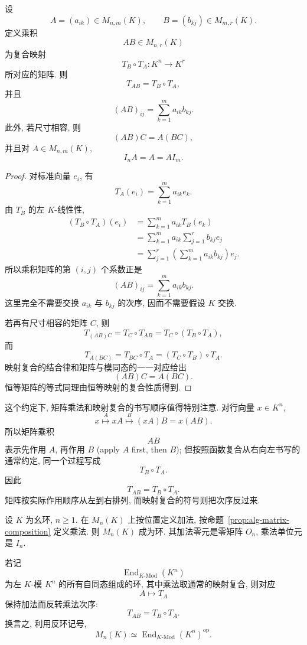 \documentclass[usesamecnt, thmcnt=section, lang=cn, newtx, 10pt, scheme=chinese]{elegantbook}
\begin{document}
\begin{proposition}\label{prop:alg-matrix-composition}
设
\[
 A=(a_{ik})\in M_{n,m}(K),
 \qquad
 B=(b_{kj})\in M_{m,r}(K).
\]
定义乘积
\[
 AB\in M_{n,r}(K)
\]
为复合映射
\[
 T_B\circ T_A:K^n\longrightarrow K^r
\]
所对应的矩阵. 则
\[
 T_{AB}=T_B\circ T_A,
\]
并且
\[
 (AB)_{ij}
 =
 \sum_{k=1}^m a_{ik}b_{kj}.
\]
此外, 若尺寸相容, 则
\[
 (AB)C=A(BC),
\]
并且对 $A\in M_{n,m}(K)$,
\[
 I_nA=A=AI_m.
\]
\end{proposition}

\begin{proof}
对标准向量 $e_i$, 有
\[
 T_A(e_i)
 =\sum_{k=1}^m a_{ik}e_k.
\]
由 $T_B$ 的左 $K$-线性性,
\[
 \begin{aligned}
 (T_B\circ T_A)(e_i)
 &=\sum_{k=1}^m a_{ik}T_B(e_k)\\
 &=\sum_{k=1}^m a_{ik}
   \sum_{j=1}^r b_{kj}e_j\\
 &=\sum_{j=1}^r
   \left(\sum_{k=1}^m a_{ik}b_{kj}\right)e_j.
 \end{aligned}
\]
所以乘积矩阵的第 $(i,j)$ 个系数正是
\[
 (AB)_{ij}
 =
 \sum_{k=1}^m a_{ik}b_{kj}.
\]
这里完全不需要交换 $a_{ik}$ 与 $b_{kj}$ 的次序, 因而不需要假设 $K$ 交换.

若再有尺寸相容的矩阵 $C$, 则
\[
 T_{(AB)C}
 =T_C\circ T_{AB}
 =T_C\circ(T_B\circ T_A),
\]
而
\[
 T_{A(BC)}
 =T_{BC}\circ T_A
 =(T_C\circ T_B)\circ T_A.
\]
映射复合的结合律和矩阵与模同态的一一对应给出
\[
 (AB)C=A(BC).
\]
恒等矩阵的等式同理由恒等映射的复合性质得到.
\end{proof}

这个约定下, 矩阵乘法和映射复合的书写顺序值得特别注意. 对行向量 $x\in K^n$,
\[
 x
 \overset{A}{\longmapsto}
 xA
 \overset{B}{\longmapsto}
 (xA)B
 =x(AB).
\]
所以矩阵乘积
\[
 AB
\]
表示{\color{blue}先作用 $A$, 再作用 $B$ (apply $A$ first, then $B$)}; 但按照函数复合从右向左书写的通常约定, 同一个过程写成
\[
 T_B\circ T_A.
\]
因此
\[
 \boxed{T_{AB}=T_B\circ T_A}.
\]
矩阵按实际作用顺序从左到右排列, 而映射复合的符号则把次序反过来.

\begin{proposition}\label{prop:alg-matrix-ring}
设 $K$ 为幺环, $n\geq1$. 在 $M_n(K)$ 上按位置定义加法, 按命题~\ref{prop:alg-matrix-composition} 定义乘法. 则 $M_n(K)$ 成为环. 其加法零元是零矩阵 $O_n$, 乘法单位元是 $I_n$.

若记
\[
 \operatorname{End}_{K\text{-}\mathrm{Mod}}(K^n)
\]
为左 $K$-模 $K^n$ 的所有自同态组成的环, 其中乘法取通常的映射复合, 则对应
\[
 A\longmapsto T_A
\]
保持加法而反转乘法次序:
\[
 T_{AB}=T_B\circ T_A.
\]
换言之, 利用反环记号,
\[
 M_n(K)
 \simeq
 \operatorname{End}_{K\text{-}\mathrm{Mod}}(K^n)^{\operatorname{op}}.
\]
\end{proposition}
\end{document}
